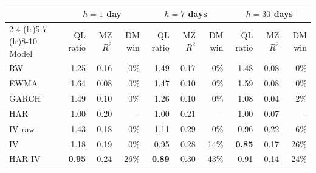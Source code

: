 \begin{tabular}{@{}lrrrrrrrrr@{}}
\toprule
 & \multicolumn{3}{c}{$h=1$ day} & \multicolumn{3}{c}{$h=7$ days} & \multicolumn{3}{c}{$h=30$ days} \\
\cmidrule(lr){2-4} \cmidrule(lr){5-7} \cmidrule(lr){8-10}
Model & QL ratio & MZ $R^2$ & DM win & QL ratio & MZ $R^2$ & DM win & QL ratio & MZ $R^2$ & DM win \\
\midrule
RW & 1.25 & 0.16 & 0\% & 1.49 & 0.17 & 0\% & 1.48 & 0.08 & 0\% \\
EWMA & 1.64 & 0.08 & 0\% & 1.47 & 0.10 & 0\% & 1.59 & 0.08 & 0\% \\
GARCH & 1.49 & 0.10 & 0\% & 1.26 & 0.10 & 0\% & 1.08 & 0.04 & 2\% \\
HAR & 1.00 & 0.20 & -- & 1.00 & 0.21 & -- & 1.00 & 0.07 & -- \\
IV-raw & 1.43 & 0.18 & 0\% & 1.11 & 0.29 & 0\% & 0.96 & 0.22 & 6\% \\
IV & 1.18 & 0.19 & 0\% & 0.95 & 0.28 & 14\% & \textbf{0.85} & 0.17 & 26\% \\
HAR-IV & \textbf{0.95} & 0.24 & 26\% & \textbf{0.89} & 0.30 & 43\% & 0.91 & 0.14 & 24\% \\
\bottomrule
\end{tabular}
